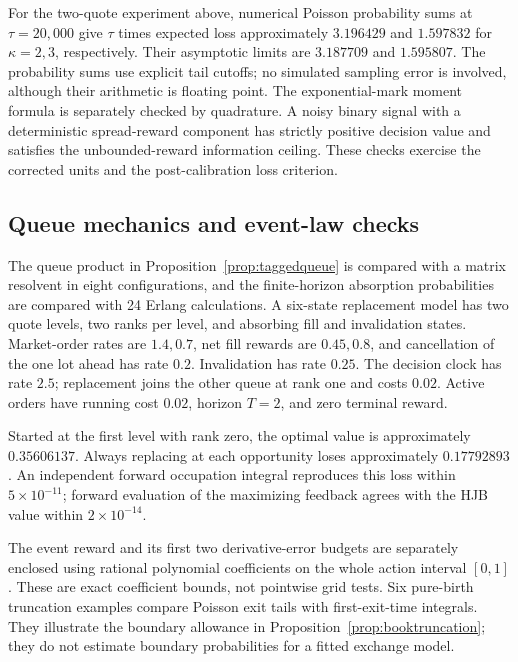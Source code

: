 \documentclass[11pt]{article}
\theoremstyle{plain}
\theoremstyle{definition}
\theoremstyle{remark}
\begin{document}
For the two-quote experiment above, numerical Poisson probability sums
at \(\tau=20{,}000\) give \(\tau\) times expected loss approximately
\(3.196429\) and \(1.597832\) for \(\kappa=2,3\), respectively.
Their asymptotic limits are \(3.187709\) and \(1.595807\).
The probability sums use explicit tail cutoffs; no simulated sampling
error is involved, although their arithmetic is floating point.
The exponential-mark moment formula is separately checked by quadrature.
A noisy binary signal with a deterministic spread-reward component
has strictly positive decision value and satisfies the unbounded-reward
information ceiling. These checks exercise the corrected units and the
post-calibration loss criterion.

\subsection{Queue mechanics and event-law checks}

The queue product in Proposition~\ref{prop:taggedqueue} is compared
with a matrix resolvent in eight configurations, and the finite-horizon
absorption probabilities are compared with 24 Erlang calculations.
A six-state replacement model has two quote levels, two ranks per
level, and absorbing fill and invalidation states. Market-order rates
are \(1.4,0.7\), net fill rewards are \(0.45,0.8\), and cancellation
of the one lot ahead has rate \(0.2\). Invalidation has rate \(0.25\).
The decision clock has rate \(2.5\); replacement joins the other
queue at rank one and costs \(0.02\). Active orders have running
cost \(0.02\), horizon \(T=2\), and zero terminal reward.

Started at the first level with rank zero, the optimal value is
approximately \(0.35606137\). Always replacing at each opportunity
loses approximately \(0.17792893\). An independent forward occupation
integral reproduces this loss within \(5\times10^{-11}\); forward
evaluation of the maximizing feedback agrees with the HJB value
within \(2\times10^{-14}\).

The event reward and its first two derivative-error budgets are
separately enclosed using rational polynomial coefficients on the
whole action interval \([0,1]\). These are exact coefficient
bounds, not pointwise grid tests. Six pure-birth truncation examples
compare Poisson exit tails with first-exit-time integrals. They
illustrate the boundary allowance in
Proposition~\ref{prop:booktruncation}; they do not estimate boundary
probabilities for a fitted exchange model.
\end{document}
